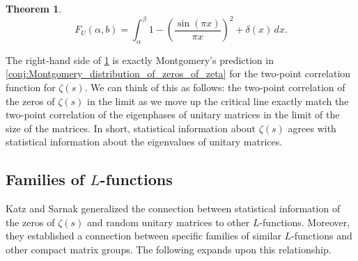 \documentclass[12pt]{book}
\newtheorem{theorem}{Theorem}[section]
\theoremstyle{definition}\newframedtheorem{method}{Method}
\renewcommand{\a}{\alpha}
\renewcommand{\b}{\beta}
\renewcommand{\d}{\delta}
\newcommand{\z}{\zeta}
\newcommand{\<}{\langle}
\renewcommand{\>}{\rangle}
\begin{document}
      \begin{theorem}\label{thm:Dyson_unitary_distribution}
      \phantom{ }
      \[
        F_{U}(\a,b) = \int_{\a}^{\b}1-\left(\frac{\sin(\pi x)}{\pi x}\right)^{2}+\d(x)\,dx.
      \]
      \end{theorem}

      The right-hand side of \cref{thm:Dyson_unitary_distribution} is exactly Montgomery's prediction in \cref{conj:Montgomery_distribution_of_zeros_of_zeta} for the two-point correlation function for $\z(s)$. We can think of this as follows: the two-point correlation of the zeros of $\z(s)$ in the limit as we move up the critical line exactly match the two-point correlation of the eigenphases of unitary matrices in the limit of the size of the matrices. In short, statistical information about $\z(s)$ agrees with statistical information about the eigenvalues of unitary matrices.
    \subsection*{Families of \texorpdfstring{$L$}{L}-functions}
      Katz and Sarnak generalized the connection between statistical information of the zeros of $\z(s)$ and random unitary matrices to other $L$-functions. Moreover, they established a connection between specific families of similar $L$-functions and other compact matrix groups. The following expands upon this relationship.
\end{document}
